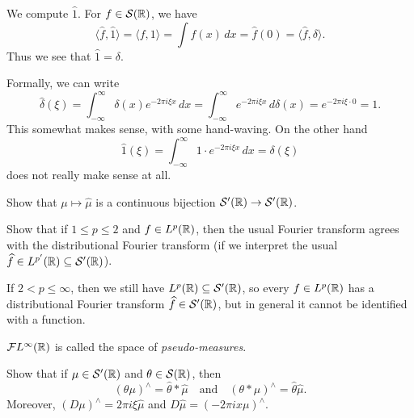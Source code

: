 \begin{example}
  We compute $\widehat{1}$.
  For $f \in \mathcal{S}(\mathbb{R})$, we have
  \[
    \langle \widehat{f}, \widehat{1} \rangle
    = \langle f, 1 \rangle
    = \int f(x)\, dx
    = \widehat{f}(0)
    = \langle \widehat{f}, \delta \rangle.
  \]
  Thus we see that
  $\widehat{1} = \delta$.
\end{example}

\begin{example}
  Formally, we can write
  \[
    \widehat{\delta}(\xi)
    = \int_{-\infty}^\infty \delta(x)
    e^{-2\pi i \xi x}\, dx
    = \int_{-\infty}^\infty e^{-2\pi i \xi x}\, d\delta(x)
    = e^{-2\pi i \xi \cdot 0}
    = 1.
  \]
  This somewhat makes sense, with some
  hand-waving.
  On the other hand
  \[
    \widehat{1}(\xi)
    = \int_{-\infty}^\infty 1 \cdot e^{-2\pi i \xi x}\, dx
    = \delta(\xi)
  \]
  does not really make sense at all.
\end{example}

\begin{exercise}
  Show that $\mu \mapsto \widehat{\mu}$
  is a continuous
  bijection $\mathcal{S}'(\mathbb{R}) \to \mathcal{S}'(\mathbb{R})$.
\end{exercise}

\begin{exercise}
  Show that
  if $1 \le p \le 2$ and
  $f \in L^p(\mathbb{R})$, then the
  usual Fourier transform agrees
  with the distributional Fourier transform
  (if we interpret the usual
  $\widehat{f} \in L^{p'}(\mathbb{R}) \subseteq \mathcal{S}'(\mathbb{R})$).
\end{exercise}

\begin{remark}
  If $2 < p \le \infty$, then we still have
  $L^{p}(\mathbb{R}) \subseteq \mathcal{S}'(\mathbb{R})$,
  so every $f \in L^p(\mathbb{R})$ has a
  distributional Fourier transform
  $\widehat{f} \in \mathcal{S}'(\mathbb{R})$, but
  in general it cannot be identified with
  a function.
\end{remark}

\begin{remark}
  $\mathcal{F} L^\infty(\mathbb{R})$ is called
  the space of \emph{pseudo-measures}.
\end{remark}

\begin{exercise}
  Show that if $\mu \in \mathcal{S}'(\mathbb{R})$
  and $\theta \in \mathcal{S}(\mathbb{R})$, then
  \[
    (\theta \mu)^\wedge
    = \widehat{\theta} * \widehat{\mu}
    \quad \text{and} \quad
    (\theta * \mu)^\wedge
    = \widehat{\theta} \widehat{\mu}.
  \]
  Moreover, $(D\mu)^\wedge = 2\pi i \xi \widehat{\mu}$
  and $D\widehat{\mu} = (-2\pi i x \mu)^\wedge$.
\end{exercise}


